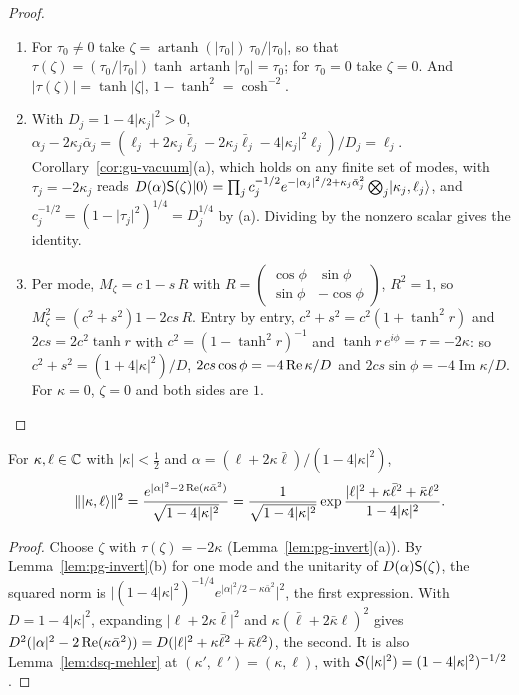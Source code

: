 \begin{veteenv}
\begin{proof}
\begin{enumerate}
\item[(a)] For $\tau_0\ne0$ take $\zeta=\operatorname{artanh}(\lvert\tau_0\rvert)\,\tau_0/\lvert\tau_0\rvert$, so that
$\tau(\zeta)=(\tau_0/\lvert\tau_0\rvert)\tanh\operatorname{artanh}\lvert\tau_0\rvert=\tau_0$; for $\tau_0=0$ take $\zeta=0$. And
$\lvert\tau(\zeta)\rvert=\tanh\lvert\zeta\rvert$, $1-\tanh^2=\cosh^{-2}$.
\item[(b)] With $D_j=1-4\lvert\kappa_j\rvert^2>0$, $\alpha_j-2\kappa_j\bar\alpha_j=(\ell_j+2\kappa_j\bar\ell_j-2\kappa_j\bar\ell_j-4\lvert\kappa_j\rvert^2\ell_j)/D_j
=\ell_j$. Corollary~\ref{cor:gu-vacuum}(a), which holds on any finite set of modes, with $\tau_j=-2\kappa_j$ reads
$D(\alpha)\mathsf S(\zeta)\lvert 0\rangle=\prod_jc_j^{-1/2}e^{-\lvert\alpha_j\rvert^2/2+\kappa_j\bar\alpha_j^2}\bigotimes_j\lvert \kappa_j,\ell_j\rangle$, and
$c_j^{-1/2}=(1-\lvert\tau_j\rvert^2)^{1/4}=D_j^{1/4}$ by (a). Dividing by the nonzero scalar gives the identity.
\item[(c)] Per mode, $M_\zeta=c\,1-s\,R$ with $R=\left(\begin{smallmatrix}\cos\phi&\sin\phi\\\sin\phi&-\cos\phi\end{smallmatrix}\right)$, $R^2=1$, so
$M_\zeta^2=(c^2+s^2)1-2cs\,R$. Entry by entry, $c^2+s^2=c^2(1+\tanh^2r)$ and $2cs=2c^2\tanh r$ with $c^2=(1-\tanh^2r)^{-1}$ and
$\tanh r\,e^{i\phi}=\tau=-2\kappa$: so $c^2+s^2=(1+4\lvert\kappa\rvert^2)/D$, $2cs\cos\phi=-4\operatorname{Re}\kappa/D$ and $2cs\sin\phi=-4\operatorname{Im}\kappa/D$. For
$\kappa=0$, $\zeta=0$ and both sides are $1$.\qedhere
\end{enumerate}
\end{proof}

\begin{corollary}\label{cor:pg-norm}
For $\kappa,\ell\in\mathbb C$ with $\lvert\kappa\rvert<\frac12$ and $\alpha=(\ell+2\kappa\bar\ell)/(1-4\lvert\kappa\rvert^2)$,
\[
 \lVert\lvert \kappa,\ell\rangle\rVert^2=\frac{e^{\lvert\alpha\rvert^2-2\operatorname{Re}(\kappa\bar\alpha^2)}}{\sqrt{1-4\lvert\kappa\rvert^2}}
 =\frac1{\sqrt{1-4\lvert\kappa\rvert^2}}\exp\frac{\lvert\ell\rvert^2+\kappa\bar\ell^2+\bar\kappa\ell^2}{1-4\lvert\kappa\rvert^2}.
\]
\end{corollary}

\begin{proof}
Choose $\zeta$ with $\tau(\zeta)=-2\kappa$ (Lemma~\ref{lem:pg-invert}(a)). By Lemma~\ref{lem:pg-invert}(b) for one mode and the unitarity of
$D(\alpha)\mathsf S(\zeta)$, the squared norm is $\lvert(1-4\lvert\kappa\rvert^2)^{-1/4}e^{\lvert\alpha\rvert^2/2-\kappa\bar\alpha^2}\rvert^2$, the first
expression. With $D=1-4\lvert\kappa\rvert^2$, expanding $\lvert\ell+2\kappa\bar\ell\rvert^2$ and $\kappa(\bar\ell+2\bar\kappa\ell)^2$ gives
$D^2(\lvert\alpha\rvert^2-2\operatorname{Re}(\kappa\bar\alpha^2))=D(\lvert\ell\rvert^2+\kappa\bar\ell^2+\bar\kappa\ell^2)$, the second. It is also
Lemma~\ref{lem:dsq-mehler} at $(\kappa',\ell')=(\kappa,\ell)$, with $\mathcal S(\lvert\kappa\rvert^2)=(1-4\lvert\kappa\rvert^2)^{-1/2}$.
\end{proof}


\end{veteenv}
